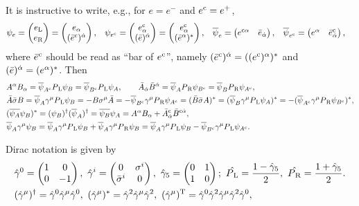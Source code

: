 \documentclass[CheatSheet]{subfiles}
\begin{document}
  It is instructive to write, e.g., for $e=e^-$ and $e^{\mathrm{c}}=e^+$,
  \begin{align*}
  &\psi_e=\pmat{e\w L\\e\w R}=\pmat{e_\alpha\\(\bar{e}^\cc)^\dalpha},
  &&\psi_{e^\cc}=\pmat{e^\cc_\alpha\\(\bar{e})^\dalpha}=\pmat{e^\cc_\alpha\\(\bar{e}^{\alpha})^*},
  &&\overline\psi_e=\pmat{e^{\cc\alpha}&\bar e_\dalpha},
  &&\overline\psi_{e^\cc}=\pmat{e^{\alpha}&\bar e^\cc_\dalpha},
  \end{align*}
  where $\bar e^{\mathrm{c}}$ should be read as ``bar of $e^{\mathrm{c}}$'', namely $(\bar{e}^{\mathrm{c}})^{\dot\alpha}=((e^{\mathrm{c}})^{\alpha})^*$ and $(\bar e)^{\dot\alpha}=(e^\alpha)^*$. Then
     \begin{align}
   &A^\alpha B_\alpha = \overline\psi_{A^{\mathrm{c}}}P_{\,\mathrm L}\psi_{B} = \overline\psi_{B^{\mathrm{c}}}P_{\,\mathrm L}\psi_{A},\qquad
   \bar A_{\dot\alpha}\bar B^{\dot\alpha} = \overline\psi_AP_{\,\mathrm R}\psi_{B^{\mathrm{c}}} = \overline\psi_BP_{\,\mathrm R}\psi_{A^{\mathrm{c}}},\\
    &\bar A\bar\sigma B=\overline\psi_{A}\gamma^\mu P_{\,\mathrm L}\psi_{B}
    =-B\sigma^{\mu}\bar A=-\overline\psi_{B^{\mathrm{c}}}\gamma^\mu P_{\,\mathrm R}\psi_{A^{\mathrm{c}}}
    =(\bar B\bar\sigma A)^*=(\overline\psi_{B}\gamma^\mu P_{\,\mathrm L}\psi_{A})^*
    =-(\overline\psi_{A^{\mathrm{c}}}\gamma^\mu P_{\,\mathrm R}\psi_{B^{\mathrm{c}}})^*,\\
 &(\overline{\psi_A}\psi_B)^* = (\psi_B)^\dagger(\overline\psi_A)^\dagger = \overline{\psi_B}\psi_A
 =A^\alpha B_\alpha+\bar{A}^{\mathrm{c}}_{\dot\alpha}\bar B^{{\mathrm{c}}{\dot\alpha}},\\
    &\overline \psi_A\gamma^\mu \psi_B
    = \overline\psi_A\gamma^\mu P_{\,\mathrm L} \psi_B + \overline \psi_A\gamma^\mu P_{\,\mathrm R} \psi_B
    = \overline\psi_A\gamma^\mu P_{\,\mathrm L} \psi_B - \overline \psi_{B^{\mathrm{c}}}\gamma^\mu P_{\,\mathrm L} \psi_{A^{\mathrm{c}}}.
   \end{align}
 \begin{RemarkBox}Dirac notation is given by
\begin{align}\label{eq:diracnotation}
& %
 \hat\gamma^0=\pmat{1&0\\0&-1},~
 \hat\gamma^i=\pmat{0&\sigma^i\\\bar\sigma^i&0},~
 \hat\gamma_5=\pmat{0&1\\1&0};~
 \hat\PL = \frac{1-\hat\gamma_5}{2},~
 \hat\PR = \frac{1+\hat\gamma_5}{2}.
\\&
(\hat\gamma^\mu)^\dagger = \hat\gamma^0\hat\gamma^\mu\hat\gamma^0,~
(\hat\gamma^\mu)^*       = \hat\gamma^2\hat\gamma^\mu\hat\gamma^2,~
(\hat\gamma^\mu)^\TT     = \hat\gamma^0\hat\gamma^2\hat\gamma^\mu\hat\gamma^2\hat\gamma^0,
\end{align}
\end{RemarkBox}
\end{document}
